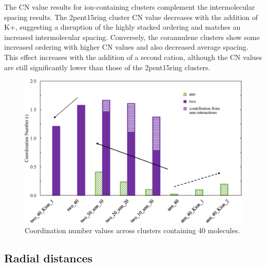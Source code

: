 The CN value results for ion-containing clusters complement the intermolecular spacing results. The 2pent15ring cluster CN value decreases with the addition of K+, suggesting a disruption of the highly stacked ordering and matches an increased intermolecular spacing. Conversely, the corannulene clusters show some increased ordering with higher CN values and also decreased average spacing. This effect increases with the addition of a second cation, although the CN values are still significantly lower than those of the 2pent15ring clusters.


\begin{figure}[!tbh]
\centering
\includegraphics[width=0.8\linewidth]{Figures/CN_bar_chart.eps}
\caption{Coordination number values across clusters containing 40 molecules.}
\label{fig:coordination_numbers}
\end{figure}
%



\subsection{Radial distances}

